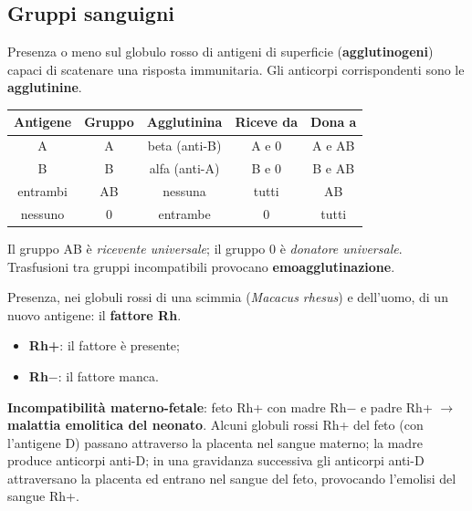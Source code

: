\subsection{Gruppi sanguigni}

Presenza o meno sul globulo rosso di antigeni di superficie (\textbf{agglutinogeni}) capaci di scatenare una risposta immunitaria. Gli anticorpi corrispondenti sono le \textbf{agglutinine}.

\begin{table}[htbp]
  \centering
  \small
  \renewcommand{\arraystretch}{1.3}
  \begin{tabular}{|c|c|c|c|c|}
    \hline
    \textbf{Antigene} & \textbf{Gruppo} & \textbf{Agglutinina} & \textbf{Riceve da} & \textbf{Dona a} \\
    \hline
    A        & A  & beta (anti-B)      & A e 0 & A e AB \\
    \hline
    B        & B  & alfa (anti-A)      & B e 0 & B e AB \\
    \hline
    entrambi & AB & nessuna            & tutti & AB \\
    \hline
    nessuno  & 0  & entrambe           & 0     & tutti \\
    \hline
  \end{tabular}
\end{table}

Il gruppo AB è \textit{ricevente universale}; il gruppo 0 è \textit{donatore universale}. Trasfusioni tra gruppi incompatibili provocano \textbf{emoagglutinazione}.

Presenza, nei globuli rossi di una scimmia (\textit{Macacus rhesus}) e dell'uomo, di un nuovo antigene: il \textbf{fattore Rh}.
\begin{itemize}
  \item \textbf{Rh+}: il fattore è presente;
  \item \textbf{Rh$-$}: il fattore manca.
\end{itemize}
\textbf{Incompatibilità materno-fetale}: feto Rh+ con madre Rh$-$ e padre Rh+ $\rightarrow$ \textbf{malattia emolitica del neonato}. Alcuni globuli rossi Rh+ del feto (con l'antigene D) passano attraverso la placenta nel sangue materno; la madre produce anticorpi anti-D; in una gravidanza successiva gli anticorpi anti-D attraversano la placenta ed entrano nel sangue del feto, provocando l'emolisi del sangue Rh+.

